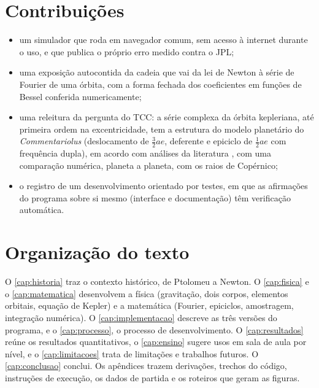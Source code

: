 \section{Contribuições}

\begin{itemize}
  \item um simulador que roda em navegador comum, sem acesso à internet durante o uso, e que publica o próprio erro medido contra o JPL;
  \item uma exposição autocontida da cadeia que vai da lei de Newton à série de Fourier de uma órbita, com a forma fechada dos coeficientes em funções de Bessel conferida numericamente;
  \item uma releitura da pergunta do TCC: a série complexa da órbita kepleriana, até primeira ordem na excentricidade, tem a estrutura do modelo planetário do \emph{Commentariolus} (deslocamento de $\tfrac{3}{2}ae$, deferente e epiciclo de $\tfrac{1}{2}ae$ com frequência dupla), em acordo com análises da literatura \cite{gallavotti1999,sugon2008}, com uma comparação numérica, planeta a planeta, com os raios de Copérnico;
  \item o registro de um desenvolvimento orientado por testes, em que as afirmações do programa sobre si mesmo (interface e documentação) têm verificação automática.
\end{itemize}

\section{Organização do texto}

O \autoref{cap:historia} traz o contexto histórico, de Ptolomeu a Newton. O \autoref{cap:fisica} e o \autoref{cap:matematica} desenvolvem a física (gravitação, dois corpos, elementos orbitais, equação de Kepler) e a matemática (Fourier, epiciclos, amostragem, integração numérica). O \autoref{cap:implementacao} descreve as três versões do programa, e o \autoref{cap:processo}, o processo de desenvolvimento. O \autoref{cap:resultados} reúne os resultados quantitativos, o \autoref{cap:ensino} sugere usos em sala de aula por nível, e o \autoref{cap:limitacoes} trata de limitações e trabalhos futuros. O \autoref{cap:conclusao} conclui. Os apêndices trazem derivações, trechos do código, instruções de execução, os dados de partida e os roteiros que geram as figuras.
